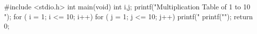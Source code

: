 #include <stdio.h>
int main(void) 
{
    int i,j;
        printf("Multiplication Table of 1 to 10 \n");
        for ( i = 1; i <= 10; i++) {
             for ( j = 1; j <= 10; j++){
            printf("%
        }
        printf("\n");  
    }
    return 0;
}
